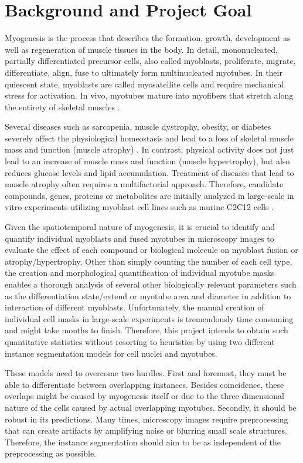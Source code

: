 \section{Background and Project Goal}
Myogenesis is the process that describes the formation, growth, development as well as regeneration of muscle tissues in the body. In detail, mononucleated, partially differentiated precursor cells, also called myoblasts, proliferate, migrate, differentiate, align, fuse to ultimately form multinucleated myotubes. In their quiescent state, myoblasts are called myosatellite cells and require mechanical stress for activation. In vivo, myotubes mature into myofibers that stretch along the entirety of skeletal muscles \cite{tajbakhsh2009, bentzinger, bollen}.

Several diseases such as sarcopenia, muscle dystrophy, obesity, or diabetes severely affect the physiological homeostasis and lead to a loss of skeletal muscle mass and function (muscle atrophy) \cite{argiles}. In contrast, physical activity does not just lead to an increase of muscle mass and function (muscle hypertrophy), but also reduces glucose levels and lipid accumulation. Treatment of diseases that lead to muscle atrophy often requires a multifactorial approach. Therefore, candidate compounds, genes, proteins or metabolites are initially analyzed in large-scale in vitro experiments utilizing myoblast cell lines such as murine C2C12 cells \cite{bajaj}.

Given the spatiotemporal nature of myogenesis, it is crucial to identify and quantify individual myoblasts and fused myotubes in microscopy images to evaluate the effect of each compound or biological molecule on myoblast fusion or atrophy/hypertrophy. Other than simply counting the number of each cell type, the creation and morphological quantification of individual myotube masks enables a thorough analysis of several other biologically relevant parameters such as the differentiation state/extend or myotube area and diameter in addition to interaction of different myoblasts. Unfortunately, the manual creation of individual cell masks in large-scale experiments is tremendously time consuming and might take months to finish. Therefore, this project intends to obtain such quantitative statistics without resorting to heuristics by using two different instance segmentation models for cell nuclei and myotubes.

These models need to overcome two hurdles. First and foremost, they must be able to differentiate between overlapping instances. Besides coincidence, these overlaps might be caused by myogenesis itself or due to the three dimensional nature of the cells caused by actual overlapping myotubes. Secondly, it should be robust in its predictions. Many times, microscopy images require preprocessing that can create artifacts by amplifying noise or blurring small scale structures. Therefore, the instance segmentation should aim to be as independent of the preprocessing as possible.

